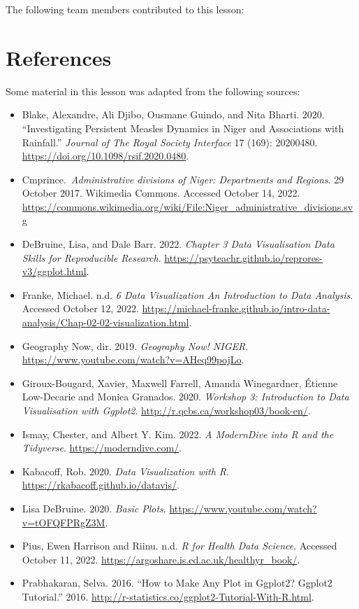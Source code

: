 \documentclass[
  letterpaper,
  DIV=11,
  numbers=noendperiod]{scrreprt}
\begin{document}
The following team members contributed to this lesson:

\hypertarget{references}{%
\section*{References}\label{references}}


Some material in this lesson was adapted from the following sources:

\begin{itemize}
\item
  Blake, Alexandre, Ali Djibo, Ousmane Guindo, and Nita Bharti. 2020.
  ``Investigating Persistent Measles Dynamics in Niger and Associations
  with Rainfall.'' \emph{Journal of The Royal Society Interface} 17
  (169): 20200480. \url{https://doi.org/10.1098/rsif.2020.0480}.
\item
  Cmprince.~\emph{Administrative divisions of Niger: Departments and
  Regions}. 29 October 2017. Wikimedia Commons. Accessed October 14,
  2022.
  \url{https://commons.wikimedia.org/wiki/File:Niger_administrative_divisions.svg}
\item
  DeBruine, Lisa, and Dale Barr. 2022. \emph{Chapter 3 Data
  Visualisation \textbar{} Data Skills for Reproducible Research}.
  \url{https://psyteachr.github.io/reprores-v3/ggplot.html}.
\item
  Franke, Michael. n.d. \emph{6 Data Visualization \textbar{} An
  Introduction to Data Analysis}. Accessed October 12, 2022.
  \url{https://michael-franke.github.io/intro-data-analysis/Chap-02-02-visualization.html}.
\item
  Geography Now, dir. 2019. \emph{Geography Now! NIGER}.
  \url{https://www.youtube.com/watch?v=AHeq99pojLo}.
\item
  Giroux-Bougard, Xavier, Maxwell Farrell, Amanda Winegardner, Étienne
  Low-Decarie and Monica Granados. 2020. \emph{Workshop 3: Introduction
  to Data Visualisation with Ggplot2}.
  \url{http://r.qcbs.ca/workshop03/book-en/}.
\item
  Ismay, Chester, and Albert Y. Kim. 2022. \emph{A ModernDive into R and
  the Tidyverse}. \url{https://moderndive.com/}.
\item
  Kabacoff, Rob. 2020. \emph{Data Visualization with R}.
  \url{https://rkabacoff.github.io/datavis/}.
\item
  Lisa DeBruine. 2020. \emph{Basic Plots}.
  \url{https://www.youtube.com/watch?v=tOFQFPRgZ3M}.
\item
  Pius, Ewen Harrison and Riinu. n.d. \emph{R for Health Data Science}.
  Accessed October 11, 2022.
  \url{https://argoshare.is.ed.ac.uk/healthyr_book/}.
\item
  Prabhakaran, Selva. 2016. ``How to Make Any Plot in Ggplot2?
  \textbar{} Ggplot2 Tutorial.'' 2016.
  \url{http://r-statistics.co/ggplot2-Tutorial-With-R.html}.
\end{itemize}
\end{document}
